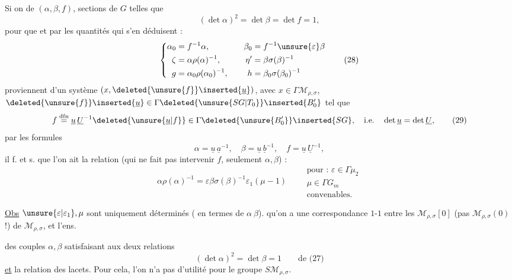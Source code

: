 Si on  de $(\alpha,\beta,f)$\deleted{$\unsure{\in}$}, sections de $G$ telles que
\[
(\det\alpha)^2=\det\beta=\det f=1,\tag{27}
\]
pour que   et par  les quantités qui s'en déduisent : 
\[
\left\{
\begin{aligned}
\alpha_0&=f^{-1}\alpha,&\quad \beta_0&=f^{-1}\unsure{\varepsilon}\beta\\
\zeta&=\alpha\rho(\alpha)^{-1},&\quad \eta'&=\beta\sigma(\beta)^{-1}\\
g&=\alpha_0\rho(\alpha_0)^{-1},&\quad h&=\beta_0\sigma(\beta_0)^{-1}
\end{aligned}
\right.\tag{28}
\]
proviennent d'un système $(x,\deleted{\unsure{f}}\inserted{\underline u})$,
avec $x\in\Gamma\mathcal M_{\rho,\sigma}$,
$\deleted{\unsure{f}}\inserted{\underline u}\in\Gamma\deleted{\unsure{SG|T_0}}\inserted{B'_0}$ tel que
\[
f\overset{\mathrm{dfn}}{=}\underline u\,\underline U^{-1}
\deleted{\unsure{\underline u|f}}
\in\Gamma\deleted{\unsure{B'_0}}\inserted{SG},
\quad\text{i.e.}\quad\det\underline u=\det\underline U,
\tag{29}
\]
par les formules
\[
\alpha=\underline u\,\underline a^{-1},\quad
\beta=\underline u\,\underline b^{-1},\quad
f=\underline u\,\underline U^{-1},\tag{30}
\]
il f. et s. que l'on ait la relation (qui ne fait pas intervenir $f$, seulement $\alpha,\beta$) :
\[
\alpha\rho(\alpha)^{-1}=\varepsilon\beta\sigma(\beta)^{-1}\varepsilon_1(\mu-1)
\qquad
\begin{gathered}
\text{pour : }\varepsilon\in\Gamma\mu_2\\
\mu\in\Gamma G_m\\
\text{convenables.}
\end{gathered}\tag{31}
\]

\uline{Obs} $\unsure{\varepsilon|\varepsilon_1},\mu$ sont uniquement déterminés ( en termes de $\alpha\ \beta$).
    qu'on a une correspondance $1$-$1$ entre les   $\mathcal M_{\rho,\sigma}[0]$ (pas $\mathcal M_{\rho,\sigma}(0)$!) de $\mathcal M_{\rho,\sigma}$, et l'ens.



des couples $\alpha,\beta$ satisfaisant aux deux relations
\[
(\det\alpha)^2=\det\beta=1\qquad\text{de (27)}
\]
\uline{et} la relation des lacets. Pour cela, l'on n'a  pas d'utilité pour le groupe $S\mathcal M_{\rho,\sigma}$.

